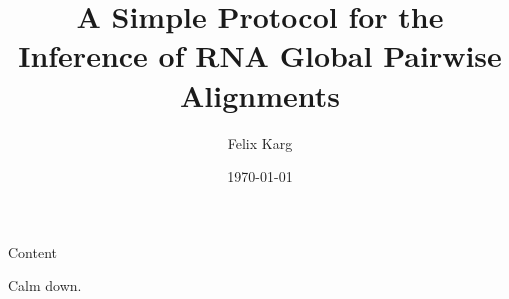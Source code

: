 \documentclass[12pt,compress,ngerman,utf8,t,usenames,dvipsnames]{beamer}
\date{\today}
\institute{University of Freiburg}
\title{A Simple Protocol for the Inference of RNA Global Pairwise Alignments}
\author{Felix Karg}
\begin{document}
\maketitle



\begin{frame}{Content}
    \large
        \tableofcontents[]
\end{frame}


%




\begin{frame}[standout]
    Calm down.
\end{frame}









\end{document}
